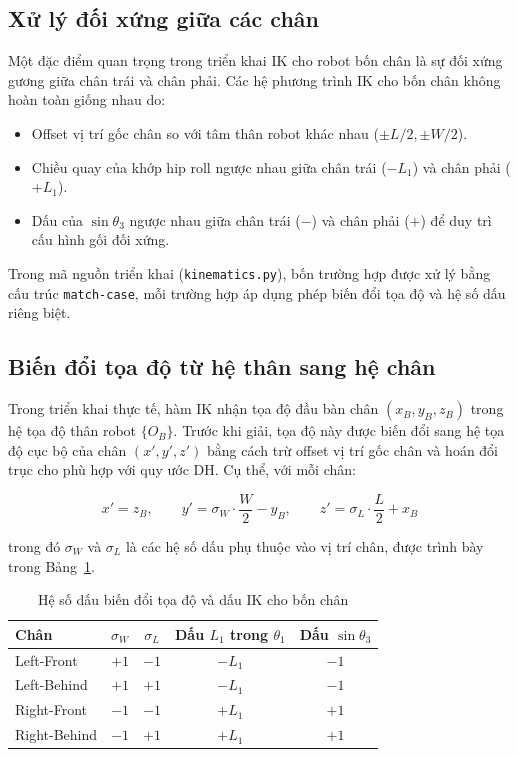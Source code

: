 \subsection{Xử lý đối xứng giữa các chân}

Một đặc điểm quan trọng trong triển khai IK cho robot bốn chân là sự đối xứng gương giữa chân trái và chân phải. Các hệ phương trình IK cho bốn chân không hoàn toàn giống nhau do:

\begin{itemize}
    \item Offset vị trí gốc chân so với tâm thân robot khác nhau ($\pm L/2, \pm W/2$).
    \item Chiều quay của khớp hip roll ngược nhau giữa chân trái ($-L_1$) và chân phải ($+L_1$).
    \item Dấu của $\sin\theta_3$ ngược nhau giữa chân trái ($-$) và chân phải ($+$) để duy trì cấu hình gối đối xứng.
\end{itemize}

Trong mã nguồn triển khai (\texttt{kinematics.py}), bốn trường hợp được xử lý bằng cấu trúc \texttt{match-case}, mỗi trường hợp áp dụng phép biến đổi tọa độ và hệ số dấu riêng biệt.

\subsection{Biến đổi tọa độ từ hệ thân sang hệ chân}

Trong triển khai thực tế, hàm IK nhận tọa độ đầu bàn chân $(x_B, y_B, z_B)$ trong hệ tọa độ thân robot $\{O_B\}$. Trước khi giải, tọa độ này được biến đổi sang hệ tọa độ cục bộ của chân $(x', y', z')$ bằng cách trừ offset vị trí gốc chân và hoán đổi trục cho phù hợp với quy ước DH. Cụ thể, với mỗi chân:

\begin{equation}
x' = z_B, \qquad
y' = \sigma_W \cdot \frac{W}{2} - y_B, \qquad
z' = \sigma_L \cdot \frac{L}{2} + x_B
\label{eq:body_to_leg}
\end{equation}

trong đó $\sigma_W$ và $\sigma_L$ là các hệ số dấu phụ thuộc vào vị trí chân, được trình bày trong Bảng~\ref{tab:ik_signs}.

\begin{table}[h]
\centering
\caption{Hệ số dấu biến đổi tọa độ và dấu IK cho bốn chân}
\label{tab:ik_signs}
\renewcommand{\arraystretch}{1.3}
\begin{tabular}{|l|c|c|c|c|}
\hline
\textbf{Chân} & $\sigma_W$ & $\sigma_L$ & Dấu $L_1$ trong $\theta_1$ & Dấu $\sin\theta_3$ \\ \hline
Left-Front  & $+1$ & $-1$ & $-L_1$ & $-1$ \\ \hline
Left-Behind & $+1$ & $+1$ & $-L_1$ & $-1$ \\ \hline
Right-Front & $-1$ & $-1$ & $+L_1$ & $+1$ \\ \hline
Right-Behind & $-1$ & $+1$ & $+L_1$ & $+1$ \\ \hline
\end{tabular}
\end{table}

